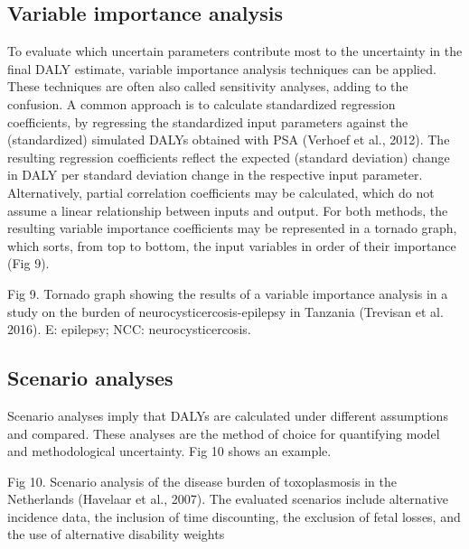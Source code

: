 \documentclass[]{book}
\begin{document}
\subsection{Variable importance
analysis}\label{variable-importance-analysis}

To evaluate which uncertain parameters contribute most to the
uncertainty in the final DALY estimate, variable importance analysis
techniques can be applied. These techniques are often also called
sensitivity analyses, adding to the confusion. A common approach is to
calculate standardized regression coefficients, by regressing the
standardized input parameters against the (standardized) simulated DALYs
obtained with PSA (Verhoef et al., 2012). The resulting regression
coefficients reflect the expected (standard deviation) change in DALY
per standard deviation change in the respective input parameter.
Alternatively, partial correlation coefficients may be calculated, which
do not assume a linear relationship between inputs and output. For both
methods, the resulting variable importance coefficients may be
represented in a tornado graph, which sorts, from top to bottom, the
input variables in order of their importance (Fig 9).

Fig 9. Tornado graph showing the results of a variable importance
analysis in a study on the burden of neurocysticercosis-epilepsy in
Tanzania (Trevisan et al. 2016). E: epilepsy; NCC: neurocysticercosis.

\subsection{Scenario analyses}\label{scenario-analyses}

Scenario analyses imply that DALYs are calculated under different
assumptions and compared. These analyses are the method of choice for
quantifying model and methodological uncertainty. Fig 10 shows an
example.

Fig 10. Scenario analysis of the disease burden of toxoplasmosis in the
Netherlands (Havelaar et al., 2007). The evaluated scenarios include
alternative incidence data, the inclusion of time discounting, the
exclusion of fetal losses, and the use of alternative disability weights
\end{document}
